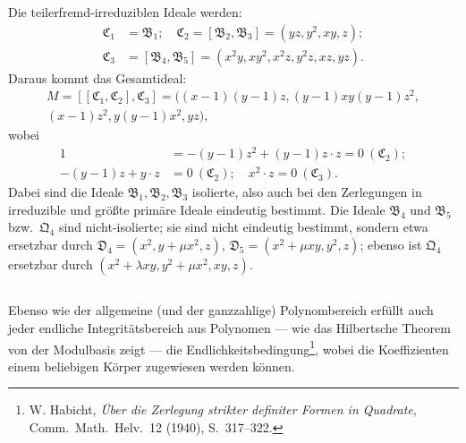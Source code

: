 \documentclass[fontsize=10pt,paper=a5,pagesize,headings=small]{scrbook}
\newcommand{\ideal}[1]{\mathfrak{#1}}
\theoremstyle{plain}
\begin{document}
Die teilerfremd-irreduziblen Ideale werden:
\begin{align*}
\ideal{C}_1 &= \ideal{B}_1;\quad \ideal{C}_2 = [\ideal{B}_2, \ideal{B}_3] = (yz, y^2, xy, z);\\
\ideal{C}_3 &= [\ideal{B}_4, \ideal{B}_5] = (x^2y, xy^2, x^2z, y^2z, xz, yz).
\end{align*}
Daraus kommt das Gesamtideal:
\begin{multline*}
M = [[\ideal{C}_1, \ideal{C}_2], \ideal{C}_3] = ((x-1)(y-1)z, (y-1)xy(y-1)z^2,\\
(x-1)z^2, y(y-1)x^2, yz),
\end{multline*}
wobei
\begin{align*}
1 &= -(y-1)z^2 + (y-1)z \cdot z = 0\ (\ideal{C}_2);\\
-(y-1)z + y \cdot z &= 0\ (\ideal{C}_2);\quad x^2 \cdot z = 0\ (\ideal{C}_3).
\end{align*}
Dabei sind die Ideale $\ideal{B}_1, \ideal{B}_2, \ideal{B}_3$ isolierte, also auch bei den
Zerlegungen in irreduzible und größte primäre Ideale eindeutig bestimmt.
Die Ideale $\ideal{B}_4$ und $\ideal{B}_5$ bzw.~$\ideal{Q}_4$ sind nicht-isolierte; sie sind nicht
eindeutig bestimmt, sondern etwa ersetzbar durch
$\ideal{D}_4 = (x^2, y + \mu x^2, z)$, $\ideal{D}_5 = (x^2 + \mu xy, y^2, z)$;
ebenso ist $\ideal{Q}_4$ ersetzbar durch $(x^2 + \lambda xy, y^2 + \mu x^2, xy, z)$.

\subsection{}

Ebenso wie der allgemeine (und der ganzzahlige) Polynombereich erfüllt
auch jeder endliche Integritätsbereich aus Polynomen --- wie das Hilbertsche
Theorem von der Modulbasis zeigt --- die Endlichkeitsbedingung\footnote{W.
Habicht, \textit{Über die Zerlegung strikter definiter Formen in Quadrate},
Comm.\ Math.\ Helv.\ 12 (1940), S.~317--322.}, wobei die Koeffizienten einem
beliebigen Körper zugewiesen werden können.
\end{document}
